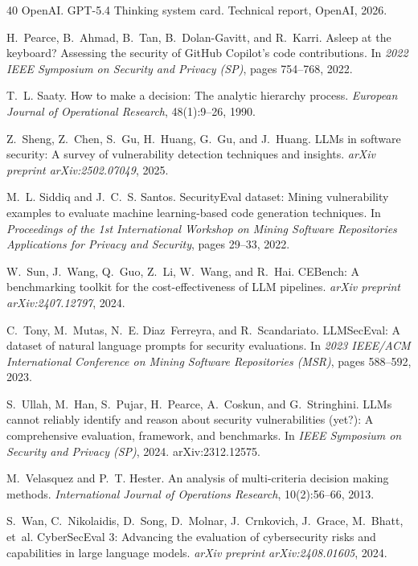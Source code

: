 \documentclass[10pt,twocolumn]{article}
\begin{document}
\begin{thebibliography}{40}
OpenAI.
\newblock GPT-5.4 Thinking system card.
\newblock Technical report, OpenAI, 2026.

H.~Pearce, B.~Ahmad, B.~Tan, B.~Dolan-Gavitt, and R.~Karri.
\newblock Asleep at the keyboard? Assessing the security of GitHub Copilot's code contributions.
\newblock In \emph{2022 IEEE Symposium on Security and Privacy (SP)}, pages 754--768, 2022.

T.~L. Saaty.
\newblock How to make a decision: The analytic hierarchy process.
\newblock \emph{European Journal of Operational Research}, 48(1):9--26, 1990.

Z.~Sheng, Z.~Chen, S.~Gu, H.~Huang, G.~Gu, and J.~Huang.
\newblock LLMs in software security: A survey of vulnerability detection techniques and insights.
\newblock \emph{arXiv preprint arXiv:2502.07049}, 2025.

M.~L. Siddiq and J.~C.~S. Santos.
\newblock SecurityEval dataset: Mining vulnerability examples to evaluate machine learning-based code generation techniques.
\newblock In \emph{Proceedings of the 1st International Workshop on Mining Software Repositories Applications for Privacy and Security}, pages 29--33, 2022.

W.~Sun, J.~Wang, Q.~Guo, Z.~Li, W.~Wang, and R.~Hai.
\newblock CEBench: A benchmarking toolkit for the cost-effectiveness of LLM pipelines.
\newblock \emph{arXiv preprint arXiv:2407.12797}, 2024.

C.~Tony, M.~Mutas, N.~E. Diaz~Ferreyra, and R.~Scandariato.
\newblock LLMSecEval: A dataset of natural language prompts for security evaluations.
\newblock In \emph{2023 IEEE/ACM International Conference on Mining Software Repositories (MSR)}, pages 588--592, 2023.

S.~Ullah, M.~Han, S.~Pujar, H.~Pearce, A.~Coskun, and G.~Stringhini.
\newblock LLMs cannot reliably identify and reason about security vulnerabilities (yet?): A comprehensive evaluation, framework, and benchmarks.
\newblock In \emph{IEEE Symposium on Security and Privacy (SP)}, 2024. arXiv:2312.12575.

M.~Velasquez and P.~T. Hester.
\newblock An analysis of multi-criteria decision making methods.
\newblock \emph{International Journal of Operations Research}, 10(2):56--66, 2013.

S.~Wan, C.~Nikolaidis, D.~Song, D.~Molnar, J.~Crnkovich, J.~Grace, M.~Bhatt, et~al.
\newblock CyberSecEval 3: Advancing the evaluation of cybersecurity risks and capabilities in large language models.
\newblock \emph{arXiv preprint arXiv:2408.01605}, 2024.

\end{thebibliography}
\end{document}
